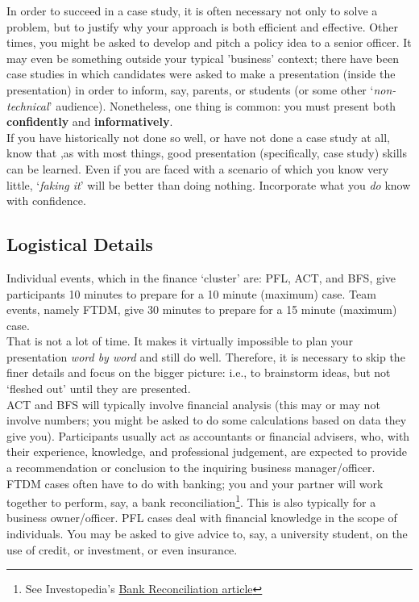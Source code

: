 \documentclass[12pt]{article}
\begin{document}
	In order to succeed in a case study, it is often necessary not only to solve a problem, but to justify why your approach is both efficient and effective. Other times, you might be asked to develop and pitch a policy idea to a senior officer. It may even be something outside your typical 'business' context; there have been case studies in which candidates were asked to make a presentation (inside the presentation) in order to inform, say, parents, or students (or some other \lq\textit{non-technical}' audience). Nonetheless, one thing is common: you must present both \textbf{confidently} and \textbf{informatively}. \\
	
	If you have historically not done so well, or have not done a case study at all, know that ,as with most things, good presentation (specifically, case study) skills can be learned. Even if you are faced with a scenario of which you know very little, \lq \textit{faking it}' will be better than doing nothing. Incorporate what you \textit{do} know with confidence.

\subsection{Logistical Details}

	Individual events, which in the finance \lq cluster' are: PFL, ACT, and BFS, give participants 10 minutes to prepare for a 10 minute (maximum) case. Team events, namely FTDM, give 30 minutes to prepare for a 15 minute (maximum) case. \\
	
	That is not a lot of time. It makes it virtually impossible to plan your presentation \textit{word by word} and still do well. Therefore, it is necessary to skip the finer details and focus on the bigger picture: i.e., to brainstorm ideas, but not \lq fleshed out' until they are presented. \\

	ACT and BFS will typically involve financial analysis (this may or may not involve numbers; you might be asked to do some calculations based on data they give you). Participants usually act as accountants or financial advisers, who, with their experience, knowledge, and professional judgement, are expected to provide a recommendation or conclusion to the inquiring business manager/officer. FTDM cases often have to do with banking; you and your partner will work together to perform, say, a bank reconciliation\footnote{See Investopedia's \href{http://www.investopedia.com/terms/b/bankreconciliation.asp}{Bank Reconciliation article}}. This is also typically for a business owner/officer. PFL cases deal with financial knowledge in the scope of individuals. You may be asked to give advice to, say, a university student, on the use of credit, or investment, or even insurance. \\
\end{document}
